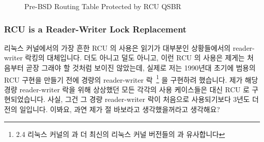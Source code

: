 \begin{figure}[tb]
\centering
{}
\caption{Pre-BSD Routing Table Protected by RCU QSBR}
\label{fig:defer:Pre-BSD Routing Table Protected by RCU QSBR}
\end{figure}

\subsubsection{RCU is a Reader-Writer Lock Replacement}
\label{sec:defer:RCU is a Reader-Writer Lock Replacement}

리눅스 커널에서의 가장 흔한 RCU 의 사용은 읽기가 대부분인 상황들에서의
reader-writer 락킹의 대체입니다.
더도 아니고 덜도 아니고, 이런 RCU 의 사용은 제게는 처음부터 곧장 그래야 할
것처럼 보이진 않았는데, 실제로 저는 1990년대 초기에 범용의 RCU 구현을 만들기
전에 경량의 reader-writer 락~\cite{WilsonCHsieh92a}\footnote{
	2.4 리눅스 커널의  과 더 최신의 리눅스 커널 버전들의
	 과 유사합니다}
을 구현하려 했습니다.
제가 해당 경량 reader-writer 락을 위해 상상했던 모든 각각의 사용 케이스들은
대신 RCU 로 구현되었습니다.
사실, 그건 그 경량 reader-writer 락이 처음으로 사용되기보다 3년도 더 전의
일입니다.
이봐요, 과연 제가 절 바보라고 생각했을꺼라고 생각해요?

